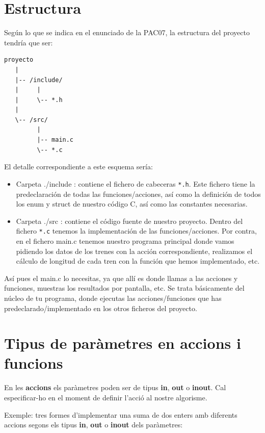 \documentclass[]{book}
\providecommand{\tightlist}{%
  \setlength{\itemsep}{0pt}\setlength{\parskip}{0pt}}
\begin{document}
\section{Estructura}\label{estructura}

Según lo que se indica en el enunciado de la PAC07, la estructura del
proyecto tendría que ser:

\begin{verbatim}
proyecto
   |
   |-- /include/
   |     |
   |     \-- *.h
   |
   \-- /src/
         |
         |-- main.c
         \-- *.c
\end{verbatim}

El detalle correspondiente a este esquema sería:

\begin{itemize}
\tightlist
\item
  Carpeta ./include : contiene el fichero de cabeceras \texttt{*.h}.
  Este fichero tiene la predeclaración de todas las funciones/acciones,
  así como la definición de todos los enum y struct de nuestro código C,
  así como las constantes necesarias.
\item
  Carpeta ./src : contiene el código fuente de nuestro proyecto. Dentro
  del fichero \texttt{*.c} tenemos la implementación de las
  funciones/acciones. Por contra, en el fichero main.c tenemos nuestro
  programa principal donde vamos pidiendo los datos de los trenes con la
  acción correspondiente, realizamos el cálculo de longitud de cada tren
  con la función que hemos implementado, etc.
\end{itemize}

Así pues el main.c lo necesitas, ya que allí es donde llamas a las
acciones y funciones, muestras los resultados por pantalla, etc. Se
trata básicamente del núcleo de tu programa, donde ejecutas las
acciones/funciones que has predeclarado/implementado en los otros
ficheros del proyecto.

\section{Tipus de paràmetres en accions i
funcions}\label{tipus-de-parametres-en-accions-i-funcions}

En les \textbf{accions} els paràmetres poden ser de tipus \textbf{in},
\textbf{out} o \textbf{inout}. Cal especificar-ho en el moment de
definir l'acció al nostre algorisme.

Exemple: tres formes d'implementar una suma de dos enters amb diferents
accions segons els tipus \textbf{in}, \textbf{out} o \textbf{inout} dels
paràmetres:
\end{document}

